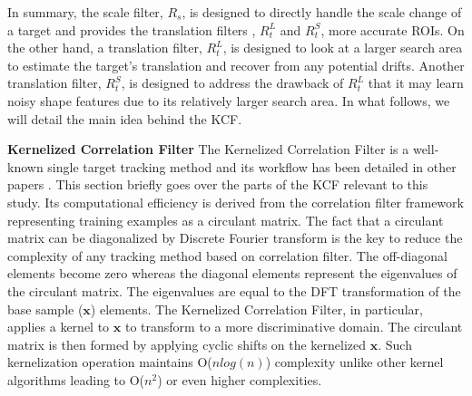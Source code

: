 \documentclass[10pt,twocolumn,letterpaper]{article}
\begin{document}
In summary, the scale filter, $R_{s}$, is designed to directly handle
the scale change of a target and provides the translation filters
, $R_{t}^{L}$ and $R_{t}^{S}$, more accurate ROIs. On the other hand, 
a translation filter, $R_{t}^{L}$, is designed to look at a larger search 
area to estimate the target's translation and recover from any potential 
drifts. Another translation filter, $R_{t}^{S}$, is designed to address the drawback of
$R_{t}^{L}$ that it may learn noisy shape features due to its relatively larger
search area. In what follows, we will detail the main idea behind the
KCF.

\textbf{Kernelized Correlation Filter} The Kernelized Correlation
Filter is a well-known single target tracking method and its workflow
has been detailed in other papers
\cite{henriques2012exploiting,henriques2015high}. This section briefly
goes over the parts of the KCF relevant to this study. Its
computational efficiency is derived from the correlation filter
framework representing training examples as a circulant matrix. The
fact that a circulant matrix can be diagonalized by Discrete Fourier
transform is the key to reduce the complexity of any tracking method
based on correlation filter. The off-diagonal elements become zero
whereas the diagonal elements represent the eigenvalues of the
circulant matrix. The eigenvalues are equal to the DFT transformation
of the base sample ($\mathbf{x}$) elements. The Kernelized Correlation
Filter, in particular, applies a kernel to $\mathbf{x}$ to transform
to a more discriminative domain. The circulant matrix is then formed
by applying cyclic shifts on the kernelized $\mathbf{x}$. Such
kernelization operation maintains O($nlog(n)$) complexity unlike other
kernel algorithms leading to O($n^{2}$) or even higher complexities.
\end{document}
